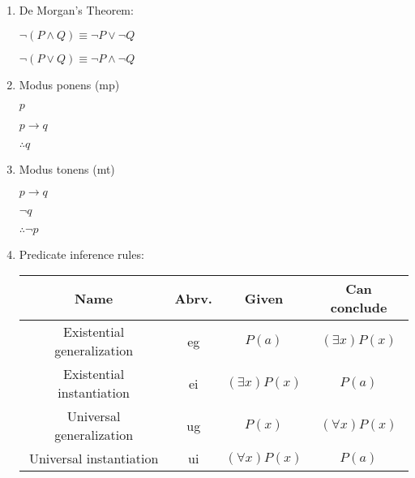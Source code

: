 \documentclass[nobib]{tufte-handout}
\begin{document}
\begin{enumerate}
    \item De Morgan's Theorem: 
    
    $\neg(P \wedge Q) \equiv \neg P \vee \neg Q$

    $\neg(P \vee Q) \equiv \neg P \wedge \neg Q$

    \item Modus ponens (mp)
    
    $p$

    $p \rightarrow q$

    $\therefore q$

    \item Modus tonens (mt)
    
    $p \rightarrow q$

    $\neg q$

    $\therefore \neg p$

    \item Predicate inference rules:
    \begin{table}[ht]
        \centering
        \begin{tabular}{|c|c|c|c|}
        \hline
        Name & Abrv. & Given & Can conclude\\
        \hline
        Existential generalization & eg & $P(a)$ & $(\exists x)P(x)$\\
        \hline
        Existential instantiation & ei & $(\exists x)P(x)$ & $P(a)$\\
        \hline
        Universal generalization & ug & $P(x)$ & $(\forall x)P(x)$\\
        \hline
        Universal instantiation & ui & $(\forall x)P(x)$ & $P(a)$\\
        \hline
        \end{tabular}
    \end{table}


\end{enumerate}
\end{document}
